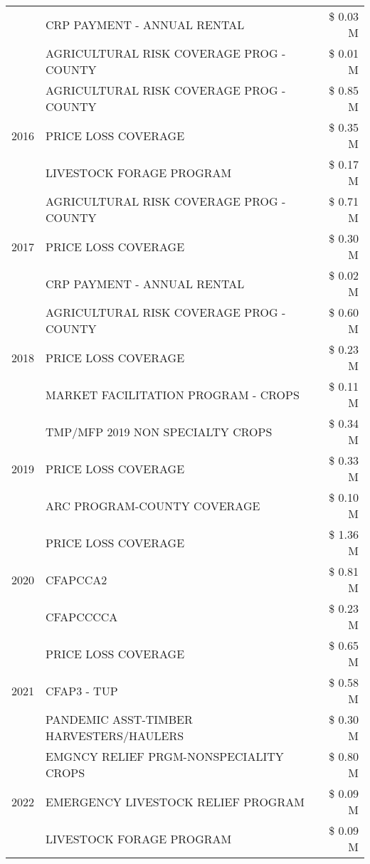 \begin{tabular}{llr}
 & CRP PAYMENT - ANNUAL RENTAL & \$ 0.03 M \\
 & AGRICULTURAL RISK COVERAGE PROG - COUNTY & \$ 0.01 M \\
\cline{1-3}
\multirow[t]{3}{*}{2016} & AGRICULTURAL RISK COVERAGE PROG - COUNTY & \$ 0.85 M \\
 & PRICE LOSS COVERAGE & \$ 0.35 M \\
 & LIVESTOCK FORAGE PROGRAM & \$ 0.17 M \\
\cline{1-3}
\multirow[t]{3}{*}{2017} & AGRICULTURAL RISK COVERAGE PROG - COUNTY & \$ 0.71 M \\
 & PRICE LOSS COVERAGE & \$ 0.30 M \\
 & CRP PAYMENT - ANNUAL RENTAL & \$ 0.02 M \\
\cline{1-3}
\multirow[t]{3}{*}{2018} & AGRICULTURAL RISK COVERAGE PROG - COUNTY & \$ 0.60 M \\
 & PRICE LOSS COVERAGE & \$ 0.23 M \\
 & MARKET FACILITATION PROGRAM - CROPS & \$ 0.11 M \\
\cline{1-3}
\multirow[t]{3}{*}{2019} & TMP/MFP 2019 NON SPECIALTY CROPS & \$ 0.34 M \\
 & PRICE LOSS COVERAGE & \$ 0.33 M \\
 & ARC PROGRAM-COUNTY COVERAGE & \$ 0.10 M \\
\cline{1-3}
\multirow[t]{3}{*}{2020} & PRICE LOSS COVERAGE & \$ 1.36 M \\
 & CFAPCCA2 & \$ 0.81 M \\
 & CFAPCCCCA & \$ 0.23 M \\
\cline{1-3}
\multirow[t]{3}{*}{2021} & PRICE LOSS COVERAGE & \$ 0.65 M \\
 & CFAP3 - TUP & \$ 0.58 M \\
 & PANDEMIC ASST-TIMBER HARVESTERS/HAULERS & \$ 0.30 M \\
\cline{1-3}
\multirow[t]{3}{*}{2022} & EMGNCY RELIEF PRGM-NONSPECIALITY CROPS & \$ 0.80 M \\
 & EMERGENCY LIVESTOCK RELIEF PROGRAM & \$ 0.09 M \\
 & LIVESTOCK FORAGE PROGRAM & \$ 0.09 M \\
\cline{1-3}
\bottomrule
\end{tabular}
